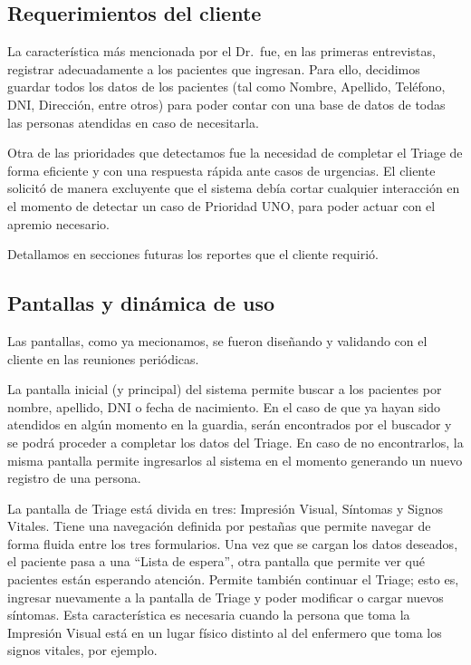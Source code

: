\subsection{Requerimientos del cliente}
La característica más mencionada por el Dr.\ fue, en las primeras entrevistas, registrar adecuadamente a los pacientes que ingresan. Para ello, decidimos guardar todos los datos de los pacientes (tal como Nombre, Apellido, Teléfono, DNI, Dirección, entre otros) para poder contar con una base de datos de todas las personas atendidas en caso de necesitarla. 

Otra de las prioridades que detectamos fue la necesidad de completar el Triage de forma eficiente y con una respuesta rápida ante casos de urgencias. El cliente solicitó de manera excluyente que el sistema debía cortar cualquier interacción en el momento de detectar un caso de Prioridad UNO, para poder actuar con el apremio necesario.

Detallamos en secciones futuras los reportes que el cliente requirió.


\subsection{Pantallas y dinámica de uso}
Las pantallas, como ya mecionamos, se fueron diseñando y validando con el cliente en las reuniones periódicas.

La pantalla inicial (y principal) del sistema permite buscar a los pacientes por nombre, apellido, DNI o fecha de nacimiento. En el caso de que ya hayan sido atendidos en algún momento en la guardia, serán encontrados por el buscador y se podrá proceder a completar los datos del Triage. En caso de no encontrarlos, la misma pantalla permite ingresarlos al sistema en el momento generando un nuevo registro de una persona. 

La pantalla de Triage está divida en tres: Impresión Visual, Síntomas y Signos Vitales. Tiene una navegación definida por pestañas que permite navegar de forma fluida entre los tres formularios. Una vez que se cargan los datos deseados, el paciente pasa a una ``Lista de espera'', otra pantalla que permite ver qué pacientes están esperando atención. Permite también continuar el Triage; esto es, ingresar nuevamente a la pantalla de Triage y poder modificar o cargar nuevos síntomas. Esta característica es necesaria cuando la persona que toma la Impresión Visual está en un lugar físico distinto al del enfermero que toma los signos vitales, por ejemplo.

